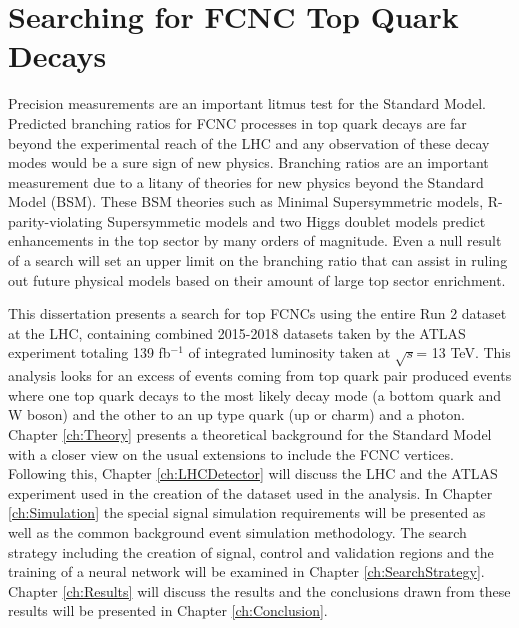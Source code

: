 \section{Searching for FCNC Top Quark Decays}
Precision measurements are an important litmus test for the Standard Model.  Predicted branching ratios for FCNC processes in top quark decays are far beyond the experimental reach of the LHC and any observation of these decay modes would be a sure sign of new physics.  Branching ratios are an important measurement due to a litany of theories for new physics beyond the Standard Model (BSM).  These BSM theories  such as Minimal Supersymmetric models\cite{MSSM}, R-parity-violating Supersymmetic models\cite{RPVSUSY} and two Higgs doublet models\cite{2HDM} predict enhancements in the top sector by many orders of magnitude.  Even a null result of a search will set an upper limit on the branching ratio that can assist in ruling out future physical models based on their amount of large top sector enrichment.

This dissertation presents a search for top FCNCs using the entire Run 2 dataset at the LHC, containing combined 2015-2018 datasets taken by the ATLAS experiment totaling 139 fb$^{-1}$ of integrated luminosity taken at $\sqrt{s}$= 13 TeV.  This analysis looks for an excess of events coming from top quark pair produced events where one top quark decays to the most likely decay mode (a bottom quark and W boson) and the other to an up type quark (up or charm) and a photon. Chapter \ref{ch:Theory} presents a theoretical background for the Standard Model with a closer view on the usual extensions to include the FCNC vertices.  Following this,  Chapter \ref{ch:LHCDetector} will discuss the LHC and the ATLAS experiment used in the creation of the dataset used in the analysis.  In Chapter \ref{ch:Simulation} the special signal simulation requirements will be presented as well as the common background event simulation methodology.  The search strategy including the creation of signal, control and validation regions and the training of a neural network will be examined in Chapter \ref{ch:SearchStrategy}.  Chapter \ref{ch:Results} will discuss the results and the conclusions drawn from these results will be presented in Chapter \ref{ch:Conclusion}.